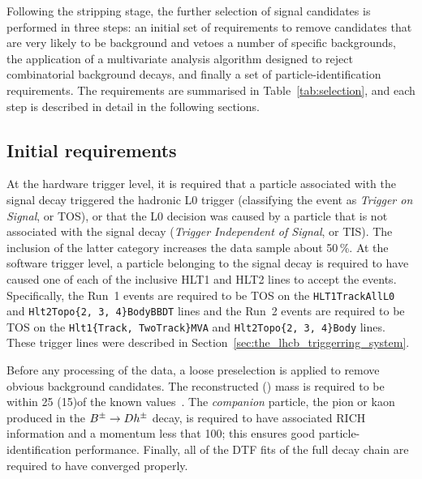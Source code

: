 Following the stripping stage, the further selection of signal candidates is performed in three steps: an initial set of requirements to remove candidates that are very likely to be background and vetoes a number of specific backgrounds, the application of a multivariate analysis algorithm designed to reject combinatorial background decays, and finally a set of particle-identification requirements. The requirements are summarised in Table~\ref{tab:selection}, and each step is described in detail in the following sections.



\subsection{Initial requirements} %
\label{sub:initial_requirements}

At the hardware trigger level, it is required that a particle associated with the signal decay triggered the hadronic L0 trigger (classifying the event as \emph{Trigger on Signal}, or TOS), or that the L0 decision was caused by a particle that is not associated with the signal decay (\emph{Trigger Independent of Signal}, or TIS). The inclusion of the latter category increases the data sample about 50\,\%. At the software trigger level, a particle belonging to the signal decay is required to have caused one of each of the inclusive HLT1 and HLT2 lines to accept the events. Specifically, the Run~1 events are required to be TOS on the \texttt{HLT1TrackAllL0} and \texttt{Hlt2Topo\{2, 3, 4\}BodyBBDT} lines and the Run~2 events are required to be TOS on the \texttt{Hlt1\{Track,\,TwoTrack\}MVA} and \texttt{Hlt2Topo\{2, 3, 4\}Body}  lines. These trigger lines were described in Section~\ref{sec:the_lhcb_triggerring_system}.

Before any processing of the data, a loose preselection is applied to remove obvious background candidates. The reconstructed \D (\KS) mass is required to be within 25 (15)\mevcc of the known values~\cite{PDG2020}. The \emph{companion} particle, the pion or kaon produced in the ${{B}^\pm}\rightarrow{\ensuremath{D}} h^\pm$ decay, is required to have associated RICH information and a momentum less that 100\gevc; this ensures good particle-identification performance. Finally, all of the DTF fits of the full decay chain are required to have converged properly.

